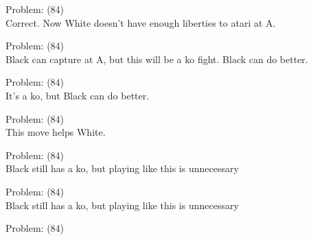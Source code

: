 \documentclass[11pt]{article}
\begin{document}
\begin{minipage}[t]{0.5\textwidth}
  {\centering
  
Problem: (84)\\
Correct. Now White doesn't have enough liberties to atari at A.\\
  }
\end{minipage}
\begin{minipage}[t]{0.5\textwidth}
  {\centering
  
Problem: (84)\\
Black can capture at A, but this will be a ko fight. Black can do better.\\
  }
\end{minipage}
\begin{minipage}[t]{0.5\textwidth}
  {\centering
  
Problem: (84)\\
It's a ko, but Black can do better.\\
  }
\end{minipage}
\begin{minipage}[t]{0.5\textwidth}
  {\centering
  
Problem: (84)\\
This move helps White.\\
  }
\end{minipage}
\begin{minipage}[t]{0.5\textwidth}
  {\centering
  
Problem: (84)\\
Black still has a ko, but playing like this is unnecessary\\
  }
\end{minipage}
\begin{minipage}[t]{0.5\textwidth}
  {\centering
  
Problem: (84)\\
Black still has a ko, but playing like this is unnecessary\\
  }
\end{minipage}
\begin{minipage}[t]{0.5\textwidth}
  {\centering
  
Problem: (84)\\
  }
\end{minipage}
\end{document}
